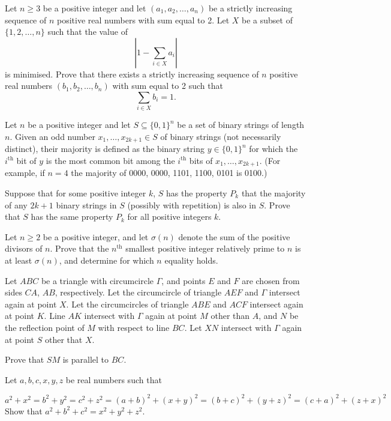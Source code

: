 \documentclass[11pt]{scrartcl}
\begin{document}
\begin{problem}[290912955085727393]
Let $n \geqslant 3$ be a positive integer and let $\left(a_{1}, a_{2}, \ldots, a_{n}\right)$ be a strictly increasing sequence of $n$ positive real numbers with sum equal to 2. Let $X$ be a subset of $\{1,2, \ldots, n\}$ such that the value of
\[
\left|1-\sum_{i \in X} a_{i}\right|
\]is minimised. Prove that there exists a strictly increasing sequence of $n$ positive real numbers $\left(b_{1}, b_{2}, \ldots, b_{n}\right)$ with sum equal to 2 such that
\[
\sum_{i \in X} b_{i}=1.
\]
\end{problem}
\begin{problem}[648819281604044]
	Let $n$ be a positive integer and let $S \subseteq \{0, 1\}^n$ be a set of binary strings of length $n$. Given an odd number $x_1, \dots, x_{2k + 1} \in S$ of binary strings (not necessarily distinct), their majority is defined as the binary string $y \in \{0, 1\}^n$ for which the $i^{\text{th}}$ bit of $y$ is the most common bit among the $i^{\text{th}}$ bits of $x_1, \dots,x_{2k + 1}$. (For example, if $n = 4$ the majority of 0000, 0000, 1101, 1100, 0101 is 0100.)

Suppose that for some positive integer $k$, $S$ has the property $P_k$ that the majority of any $2k + 1$ binary strings in $S$ (possibly with repetition) is also in $S$. Prove that $S$ has the same property $P_k$ for all positive integers $k$.
\end{problem}
\begin{problem}[3458270318471332488]
	Let $n \ge 2$ be a positive integer, and let $\sigma(n)$ denote the sum of the positive divisors of $n$. Prove that the $n^{\text{th}}$ smallest positive integer relatively prime to $n$ is at least $\sigma(n)$, and determine for which $n$ equality holds.
\end{problem}
\begin{problem}[5897111412933990257]
Let $ABC$ be a triangle with circumcircle $\Gamma$, and points $E$ and $F$ are chosen from sides $CA$, $AB$, respectively. Let the circumcircle of triangle $AEF$ and $\Gamma$ intersect again at point $X$. Let the circumcircles of triangle $ABE$ and $ACF$ intersect again at point $K$. Line $AK$ intersect with $\Gamma$ again at point $M$ other than $A$, and $N$ be the reflection point of $M$ with respect to line $BC$. Let $XN$ intersect with $\Gamma$ again at point $S$ other that $X$.

Prove that $SM$ is parallel to $BC$.
\end{problem}
\begin{problem}[8129091008921005997]
Let $a,b,c,x,y,z$ be real numbers such that

\[ a^2+x^2=b^2+y^2=c^2+z^2=(a+b)^2+(x+y)^2=(b+c)^2+(y+z)^2=(c+a)^2+(z+x)^2 \]
Show that $a^2+b^2+c^2=x^2+y^2+z^2$.
\end{problem}
\end{document}
